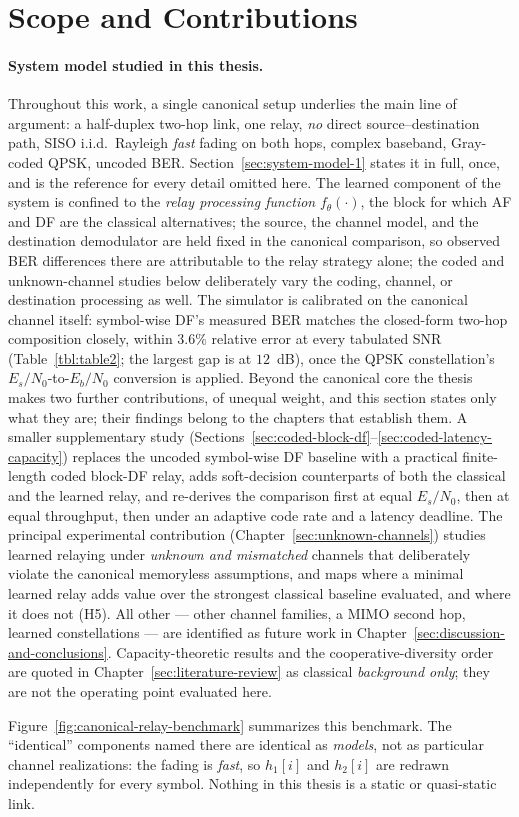 \section{Scope and Contributions}\label{sec:system-model-intro}

\paragraph{System model studied in this thesis.}
Throughout this work, a single canonical setup underlies the main line of argument: a half-duplex two-hop link, one relay, \emph{no} direct source--destination path, SISO i.i.d.\ Rayleigh \emph{fast} fading on both hops, complex baseband, Gray-coded QPSK, uncoded BER. Section~\ref{sec:system-model-1} states it in full, once, and is the reference for every detail omitted here. The learned component of the system is confined to the \emph{relay processing function} $f_\theta(\cdot)$, the block for which AF and DF are the classical alternatives; the source, the channel model, and the destination demodulator are held fixed in the canonical comparison, so observed BER differences there are attributable to the relay strategy alone; the coded and unknown-channel studies below deliberately vary the coding, channel, or destination processing as well. The simulator is calibrated on the canonical channel itself: symbol-wise DF's measured BER matches the closed-form two-hop composition closely, within $3.6\%$ relative error at every tabulated SNR (Table~\ref{tbl:table2}; the largest gap is at $12$~dB), once the QPSK constellation's $E_s/N_0$-to-$E_b/N_0$ conversion is applied. Beyond the canonical core the thesis makes two further contributions, of unequal weight, and this section states only what they are; their findings belong to the chapters that establish them. A smaller supplementary study (Sections~\ref{sec:coded-block-df}--\ref{sec:coded-latency-capacity}) replaces the uncoded symbol-wise DF baseline with a practical finite-length coded block-DF relay, adds soft-decision counterparts of both the classical and the learned relay, and re-derives the comparison first at equal $E_s/N_0$, then at equal throughput, then under an adaptive code rate and a latency deadline. The principal experimental contribution (Chapter~\ref{sec:unknown-channels}) studies learned relaying under \emph{unknown and mismatched} channels that deliberately violate the canonical memoryless assumptions, and maps where a minimal learned relay adds value over the strongest classical baseline evaluated, and where it does not (H5). All other    --- other channel families, a MIMO second hop, learned constellations --- are identified as future work in Chapter~\ref{sec:discussion-and-conclusions}. Capacity-theoretic results and the cooperative-diversity order are quoted in Chapter~\ref{sec:literature-review} as classical \emph{background only}; they are not the operating point evaluated here.

Figure~\ref{fig:canonical-relay-benchmark} summarizes this benchmark. The ``identical'' components named there are identical as \emph{models}, not as particular channel realizations: the fading is \emph{fast}, so $h_1[i]$ and $h_2[i]$ are redrawn independently for every symbol. Nothing in this thesis is a static or quasi-static link.
